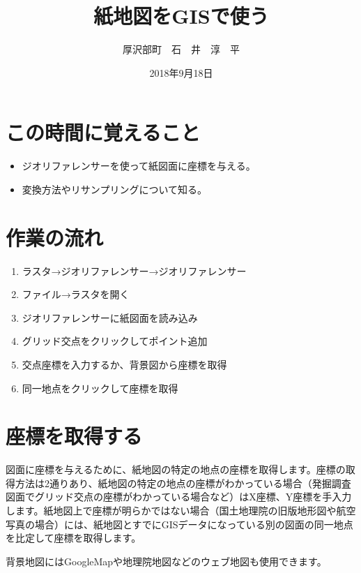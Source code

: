\documentclass[14Q,twocolumn]{jsarticle}
\title{紙地図をGISで使う}%
\date{2018年9月18日}
\author{厚沢部町　石　井　淳　平}              %
\begin{document}
\maketitle
\section{この時間に覚えること}
\begin{itemize}
\item ジオリファレンサーを使って紙図面に座標を与える。
\item 変換方法やリサンプリングについて知る。
\end{itemize}


\section{作業の流れ}
\begin{enumerate}
\item ラスタ→ジオリファレンサー→ジオリファレンサー
\item ファイル→ラスタを開く
\item ジオリファレンサーに紙図面を読み込み
\item グリッド交点をクリックしてポイント追加
\item 交点座標を入力するか、背景図から座標を取得
\item 同一地点をクリックして座標を取得
\end{enumerate}

\section{座標を取得する}
図面に座標を与えるために、紙地図の特定の地点の座標を取得します。座標の取得方法は2通りあり、紙地図の特定の地点の座標がわかっている場合（発掘調査図面でグリッド交点の座標がわかっている場合など）はX座標、Y座標を手入力します。紙地図上で座標が明らかではない場合（国土地理院の旧版地形図や航空写真の場合）には、紙地図とすでにGISデータになっている別の図面の同一地点を比定して座標を取得します。

背景地図にはGoogleMapや地理院地図などのウェブ地図も使用できます。
\end{document}
